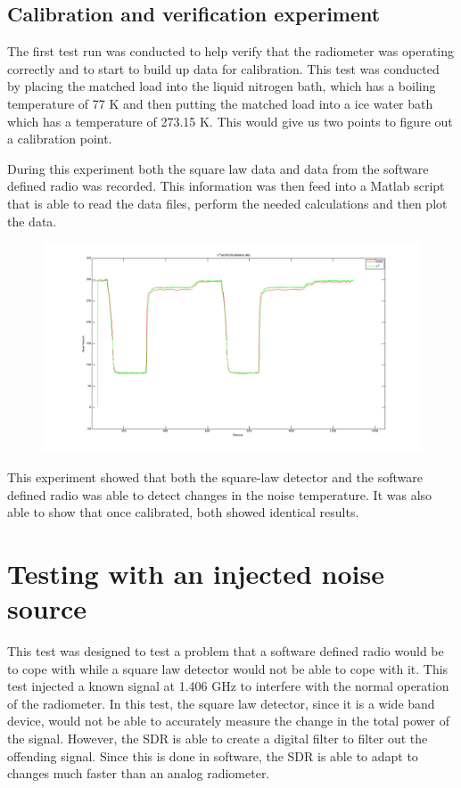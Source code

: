 \subsection{Calibration and verification experiment}
The first test run was conducted to help verify that the radiometer was operating correctly and to start to build up data for calibration.  This test was conducted by placing the matched load into the liquid nitrogen bath, which has a boiling temperature of 77 K and then putting the matched load into a ice water bath which has a temperature of 273.15 K.  This would give us two points to figure out a calibration point.

During this experiment both the square law data and data from the software defined radio was recorded.  This information was then feed into a Matlab script that is able to read the data files, perform the needed calculations and then plot the data.  

\begin{figure}[h!tb] \centering

\includegraphics[width=\textwidth]{Images/lab1_both_calib.png}

\label{lab1_x2_n200}
\end{figure}

This experiment showed that both the square-law detector and the software defined radio was able to detect changes in the noise temperature.  It was also able to show that once calibrated, both showed identical results.
\section{Testing with an injected noise source}
This test was designed to test a problem that a software defined radio would be to cope with while a square law detector would not be able to cope with it.  This test injected a known signal at 1.406 GHz to interfere with the normal operation of the radiometer.  In this test, the square law detector, since it is a wide band device, would not be able to accurately measure the change in the total power of the signal.  However, the SDR is able to create a digital filter to filter out the offending signal.  Since this is done in software, the SDR is able to adapt to changes much faster than an analog radiometer.
